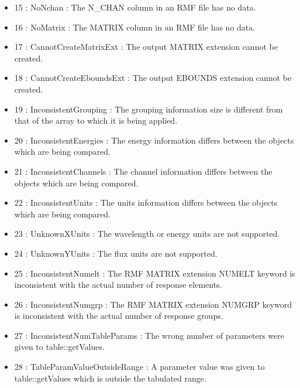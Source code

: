 \documentclass[11pt]{book}
\begin{document}
\begin{itemize}
\item 15 : NoNchan : The N\_CHAN column in an RMF file has no data.

\item 16 : NoMatrix : The MATRIX column in an RMF file has no data.

\item 17 : CannotCreateMatrixExt : The output MATRIX extension cannot be created.

\item 18 : CannotCreateEboundsExt : The output EBOUNDS extension cannot be created.

\item 19 : InconsistentGrouping : The grouping information size is
different from that of the array to which it is being applied.

\item 20 : InconsistentEnergies : The energy information differs
between the objects which are being compared.

\item 21 : InconsistentChannels : The channel information differs
between the objects which are being compared.

\item 22 : InconsistentUnits : The units information differs
between the objects which are being compared.

\item 23 : UnknownXUnits : The wavelength or energy units are not
  supported.

\item 24 : UnknownYUnits : The flux units are not supported.

\item 25 : InconsistentNumelt : The RMF MATRIX extension NUMELT
  keyword is inconsistent with the actual number of response elements.

\item 26 : InconsistentNumgrp : The RMF MATRIX extension NUMGRP
  keyword is inconsistent with the actual number of response groups.

\item 27 : InconsistentNumTableParams : The wrong number of parameters
  were given to table::getValues.

\item 28 : TableParamValueOutsideRange : A parameter value was given
  to table::getValues which is outside the tabulated range.
 
\end{itemize}
\end{document}
